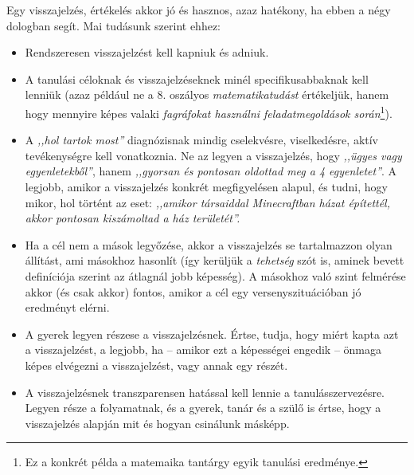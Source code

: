 Egy visszajelzés, értékelés akkor jó és hasznos, azaz hatékony, ha ebben a négy dologban segít. Mai tudásunk szerint ehhez:
\begin{itemize}
      \item Rendszeresen visszajelzést kell kapniuk és adniuk.
      \item A tanulási céloknak és visszajelzéseknek minél specifikusabbaknak kell lenniük (azaz például ne a 8. oszályos \emph{matematikatudást} értékeljük, hanem hogy mennyire képes valaki \emph{fagráfokat használni feladatmegoldások során}\footnote{Ez a konkrét példa a matemaika tantárgy egyik tanulási eredménye.}).
      \item A \emph{,,hol tartok most''} diagnózisnak mindig cselekvésre, viselkedésre, aktív tevékenységre kell vonatkoznia. Ne az legyen a visszajelzés, hogy \emph{,,ügyes vagy egyenletekből''}, hanem \emph{,,gyorsan és       pontosan oldottad meg a 4 egyenletet''}. A legjobb, amikor a visszajelzés konkrét megfigyelésen alapul, és tudni, hogy mikor, hol történt az eset: \emph{,,amikor társaiddal Minecraftban házat építettél, akkor       pontosan kiszámoltad a ház területét''.}
      \item Ha a cél nem a mások legyőzése, akkor a visszajelzés se tartalmazzon olyan állítást, ami másokhoz hasonlít (így kerüljük a \emph{tehetség} szót is, aminek bevett definíciója szerint az átlagnál jobb képesség). A másokhoz való szint felmérése akkor (és csak akkor) fontos, amikor a cél egy versenyszituációban jó eredményt elérni.

      \item A gyerek legyen részese a visszajelzésnek. Értse, tudja, hogy miért kapta azt a visszajelzést, a legjobb, ha -- amikor ezt a képességei engedik -- önmaga képes elvégezni a visszajelzést, vagy annak egy részét.
      \item A visszajelzésnek transzparensen hatással kell lennie a tanulásszervezésre. Legyen része a folyamatnak, és a gyerek, tanár és a szülő is értse, hogy a visszajelzés alapján mit és hogyan csinálunk másképp.
\end{itemize}

